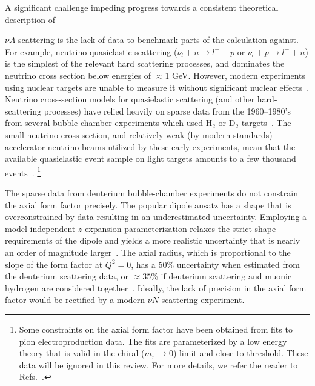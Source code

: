 A significant challenge impeding progress towards a consistent theoretical description of%
\begin{marginnote}
\end{marginnote}%
$\nu A$ scattering is the lack of data to benchmark parts of the calculation against. For example, neutrino quasielastic scattering ($\nu_{l} + n \rightarrow l^{-} + p$ or $\bar{\nu}_{l} + p \rightarrow l^{+} + n$) is the simplest of the relevant hard scattering processes, and dominates the neutrino cross section below energies of $\approx$1 GeV. However, modern experiments using nuclear targets are unable to measure it without significant nuclear effects~\cite{garvey_review_2014, NuSTEC:2017hzk}.
Neutrino cross-section models for quasielastic scattering (and other hard-scattering processes) have relied heavily on sparse data from the 1960--1980's from several bubble chamber experiments which used H$_{2}$ or D$_2$ targets~\cite{zeller12, ParticleDataGroup:2020ssz}.
The small neutrino cross section, and relatively weak (by modern standards) accelerator neutrino beams utilized by these early experiments, mean that the available quasielastic event sample on light targets amounts to a few thousand events~\cite{ANL_Barish_1977, BNL_Fanourakis_1980, BNL_Baker_1981, Kitagaki:1983px, Allasia:1990uy}.%
\footnote{Some constraints on the axial form factor have been obtained from fits
 to pion electroproduction data.
The fits are parameterized by a low energy theory that is valid in the chiral
 ($m_\pi\to0$) limit and close to threshold.
These data will be ignored in this review.
For more details, we refer the reader to Refs.~\cite{Bernard:1993bq,Bernard:2001rs}.
}

The sparse data from deuterium bubble-chamber experiments do not constrain
the axial form factor precisely.
The popular dipole ansatz has a shape that
is overconstrained by data resulting in an underestimated uncertainty.
Employing a model-independent $z$-expansion parameterization
relaxes the strict shape requirements of the dipole and yields
a more realistic uncertainty that is nearly an order of magnitude larger~\cite{Meyer:2016oeg}.
The axial radius, which is proportional to the slope of the form factor at $Q^2=0$,
has a 50\% uncertainty when estimated from the deuterium scattering data,
or $\approx35\%$ if deuterium scattering and muonic hydrogen are considered
together~\cite{Hill:2017wgb}.
Ideally, the lack of precision in the axial form factor would
be rectified by a modern $\nu N$ scattering experiment.

